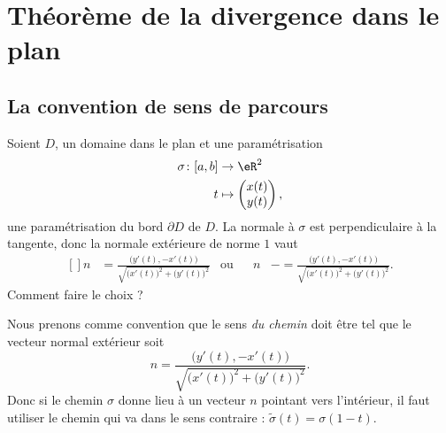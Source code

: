 \section{Théorème de la divergence dans le plan}

\subsection{La convention de sens de parcours}

Soient $D$, un domaine dans le plan et une paramétrisation
\begin{equation}
    \begin{aligned}
        \sigma\colon \mathopen[ a , b \mathclose]&\to \eR^2 \\
        t&\mapsto \begin{pmatrix}
            x(t)    \\
            y(t)
        \end{pmatrix},
    \end{aligned}
\end{equation}
une paramétrisation du bord $\partial D$ de $D$. La normale à $\sigma$ est perpendiculaire à la tangente, donc la normale extérieure de norme $1$ vaut
\begin{equation}
    \begin{aligned}[]
        n&=\frac{ \big( y'(t),-x'(t) \big) }{ \sqrt{ \big( x'(t)\big)^2+\big( y'(t) \big)^2  } }&\text{ou}&&n&-=\frac{ \big( y'(t),-x'(t) \big) }{ \sqrt{ \big( x'(t)\big)^2+\big( y'(t) \big)^2  } }.
    \end{aligned}
\end{equation}
Comment faire le choix ?

Nous prenons comme convention que le sens \emph{du chemin} doit être tel que le vecteur normal extérieur soit
\begin{equation}
        n=\frac{ \big( y'(t),-x'(t) \big) }{ \sqrt{ \big( x'(t)\big)^2+\big( y'(t) \big)^2  } }.
\end{equation}
Donc si le chemin $\sigma$ donne lieu à un vecteur $n$ pointant vers l'intérieur, il faut utiliser le chemin qui va dans le sens contraire : $\tilde \sigma(t)=\sigma(1-t)$.

